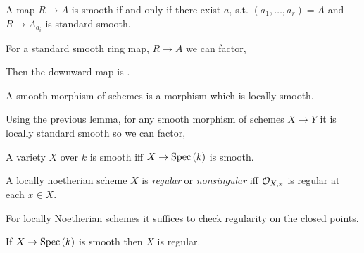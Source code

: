 \documentclass[12pt]{article}
\begin{document}
\begin{lemma}
A map $R \to A$ is smooth if and only if there exist $a_i$ s.t. $(a_1, \dots, a_r) = A$ and $R \to A_{a_i}$ is standard smooth.
\end{lemma}

\begin{defn}
For a standard smooth ring map, $R \to A$ we can factor,
\begin{center}
\end{center}
Then the downward map is \etale.
\end{defn}

\begin{defn}
A smooth morphism of schemes is a morphism which is locally smooth. 
\end{defn}


\begin{rmk}
Using the previous lemma, for any smooth morphism of schemes $X \to Y$ it is locally standard smooth so we can factor,
\begin{center}
\end{center}
\end{rmk}

\begin{defn}
A variety $X$ over $k$ is smooth iff $X \to \mathrm{Spec}\left( k \right)$ is smooth.
\end{defn}

\begin{defn}
A locally noetherian scheme $X$ is \textit{regular} or \textit{nonsingular} iff $\mathcal{O}_{X, x}$ is regular at each $x \in X$.
\end{defn}

\begin{rmk}
For locally Noetherian schemes it suffices to check regularity on the closed points. 
\end{rmk}

\begin{theorem}
If $X \to \mathrm{Spec}\left( k \right)$ is smooth then $X$ is regular. 
\end{theorem}
\end{document}
